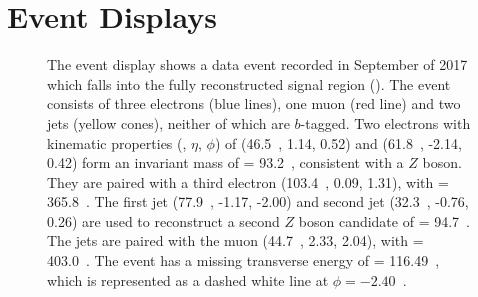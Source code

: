 \chapter[Event Displays][Event Displays]{Event Displays}
\label{app:eventdisplays}
\begin{figure}[h]
    \centering
    \caption[Event display for data event in the \SRFR signal region]{ The event display shows a data event recorded in September of 2017 which falls into the fully reconstructed signal region (\SRTL).
    The event consists of three electrons (blue lines), one muon (red line)  and two jets (yellow cones), neither of which are $b$-tagged.
    Two electrons with kinematic properties (\pt, $\eta$, $\phi$) of (46.5~\GeV, 1.14, 0.52) and (61.8~\GeV, -2.14, 0.42) form an invariant mass of \mll= 93.2~\GeV, consistent with a $Z$ boson.
    They are paired with a third electron (103.4~\GeV, 0.09, 1.31), with \mZl= 365.8~\GeV.
    The first jet (77.9~\GeV, -1.17, -2.00) and second jet (32.3~\GeV, -0.76, 0.26) are used to reconstruct a second $Z$ boson candidate of \mjj= 94.7~\GeV.
    The jets are paired with the muon (44.7~\GeV, 2.33, 2.04), with \mZl = 403.0~\GeV.
    The event has a missing transverse energy of \met = 116.49~\GeV, which is represented as a dashed white line at $\phi=-2.40$~\cite{ATLAS:2020uer}.}
    \label{fig:eventdisplaySRFR}
\end{figure}

